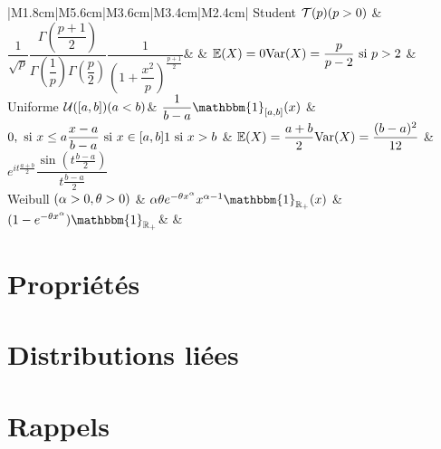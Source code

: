 \documentclass[a4paper, 11pt]{article}
\begin{document}
\begin{tabular}{|M{1.8cm}|M{5.6cm}|M{3.6cm}|M{3.4cm}|M{2.4cm}|}
\hline	
Student $\mathcal{T}(p) \newline (p>0)$ & $\dfrac{1}{\sqrt{p}} \dfrac{\Gamma \left( \dfrac{p+1}{2} \right)}{\Gamma \left(  \dfrac{1}{p}\right) \Gamma \left( \dfrac{p}{2}\right)} \dfrac{1}{\left( 1 + \dfrac{x^2}{p}\right)^{\frac{p+1}{2}}}$& & $\mathbb{E}(X) = 0 \newline \text{Var}(X)= \dfrac{p}{p-2} \text{ si } p>2$ & \\
\hline
Uniforme $\mathcal{U}([a,b]) \newline (a<b)$& $\dfrac{1}{b-a} \mathbbm{1}_{[a,b]}(x)$ & $0, \text{ si } x \leq a \newline \dfrac{x-a}{b-a} \text{ si } x \in [a,b] \newline 1 \text{ si } x > b$ & $\mathbb{E}(X)= \dfrac{a+b}{2} \newline \text{Var}(X)=\dfrac{(b-a)^2}{12}$ & $e^{it\frac{a+b}{2}} \dfrac{\sin(t \frac{b-a}{2})}{t \frac{b-a}{2}}$\\
\hline
Weibull $(\alpha >0, \newline \theta >0)$ & $\alpha \theta e^{-\theta x^{\alpha}} x^{\alpha -1} \mathbbm{1}_{\mathbb{R}_+}(x)$ & $(1-e^{-\theta x^{\alpha}}) \mathbbm{1}_{\mathbb{R}_+}$& & \\
\hline
\end{tabular}

\section{Propriétés}

\section{Distributions liées}

\section{Rappels}
\end{document}
